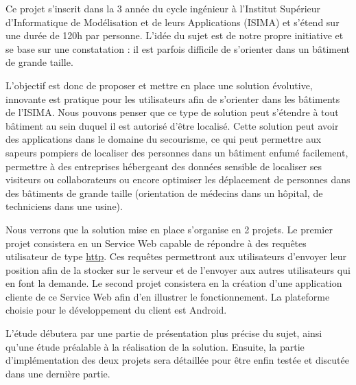 
Ce projet s'inscrit dans la 3 année du cycle ingénieur à l’Institut Supérieur d’Informatique de Modélisation et de leurs Applications (ISIMA) et s'étend sur une durée de 120h par personne. L'idée du sujet est de notre propre initiative et se base sur une constatation : il est parfois difficile de s'orienter dans un bâtiment de grande taille.

L'objectif est donc de proposer et mettre en place une solution évolutive, innovante est pratique pour les utilisateurs afin de s'orienter dans les bâtiments de l'ISIMA. Nous pouvons penser que ce type de solution peut s'étendre à tout bâtiment au sein duquel il est autorisé d'être localisé. Cette solution peut avoir des applications dans le domaine du secourisme, ce qui peut permettre aux sapeurs pompiers de localiser des personnes dans un bâtiment enfumé facilement, permettre à des entreprises hébergeant des données sensible de localiser ses visiteurs ou collaborateurs ou encore optimiser les déplacement de personnes dans des bâtiments de grande taille (orientation de médecins dans un hôpital, de techniciens dans une usine).

Nous verrons que la solution mise en place s'organise en 2 projets. Le premier projet consistera en un Service Web capable de répondre à des requêtes utilisateur de type \underline{http}. Ces requêtes permettront aux utilisateurs d'envoyer leur position afin de la stocker sur le serveur et de l'envoyer aux autres utilisateurs qui en font la demande. Le second projet consistera en la création d'une application cliente de ce Service Web afin d'en illustrer le fonctionnement. La plateforme choisie pour le développement du client est Android.

L'étude débutera par une partie de présentation plus précise du sujet, ainsi qu'une étude préalable à la réalisation de la solution. Ensuite, la partie d'implémentation des deux projets sera détaillée pour être enfin testée et discutée dans une dernière partie.

